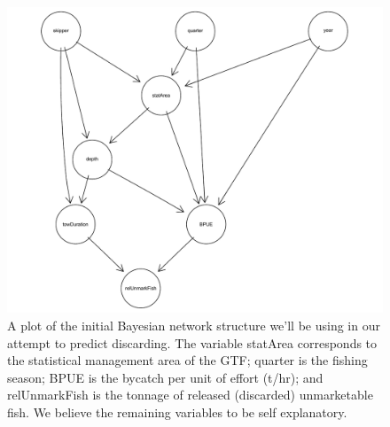 \documentclass{article}
\begin{document}
\begin{figure}[!h]
\begin{center}
\includegraphics[scale = 0.8]{Images/BN.pdf}
\end{center}
\caption{A plot of the initial Bayesian network structure we'll be using in our attempt to predict discarding. The variable statArea corresponds to the statistical management area of the GTF; quarter is the fishing season; BPUE is the bycatch per unit of effort (t/hr); and relUnmarkFish is the tonnage of released (discarded) unmarketable fish. We believe the remaining variables to be self explanatory. } \label{fig:BN}
\end{figure}
\end{document}
